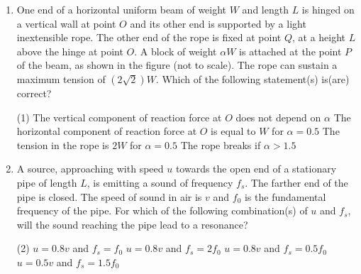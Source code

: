 \documentclass{article}
\begin{document}
\begin{enumerate}
    \item One end of a horizontal uniform beam of weight $W$ and length $L$ is hinged on a vertical wall at point $O$ and its other end is supported by a light inextensible rope. The other end of the rope is fixed at point $Q$, at a height $L$ above the hinge at point $O$. A block of weight $\alpha W$ is attached at the point $P$ of the beam, as shown in the figure (not to scale). The rope can sustain a maximum tension of $(2\sqrt{2})W$. Which of the following statement(s) is(are) correct?
    \begin{center}
    \end{center}
        \begin{tasks}(1)
            \task The vertical component of reaction force at $O$ does not depend on $\alpha$
            \task The horizontal component of reaction force at $O$ is equal to $W$ for $\alpha = 0.5$
            \task The tension in the rope is $2W$ for $\alpha = 0.5$
            \task The rope breaks if $\alpha > 1.5$
        \end{tasks}
        
    \item A source, approaching with speed $u$ towards the open end of a stationary pipe of length $L$, is emitting a sound of frequency $f_s$. The farther end of the pipe is closed. The speed of sound in air is $v$ and $f_0$ is the fundamental frequency of the pipe. For which of the following combination(s) of $u$ and $f_s$, will the sound reaching the pipe lead to a resonance?
        \begin{tasks}(2)
            \task $ u = 0.8v $ and $ f_s = f_0 $
            \task $ u = 0.8v $ and $ f_s = 2f_0 $
            \task $ u = 0.8v $ and $ f_s = 0.5f_0 $
            \task $ u = 0.5v $ and $ f_s = 1.5f_0 $
        \end{tasks}


\end{enumerate}
\end{document}
